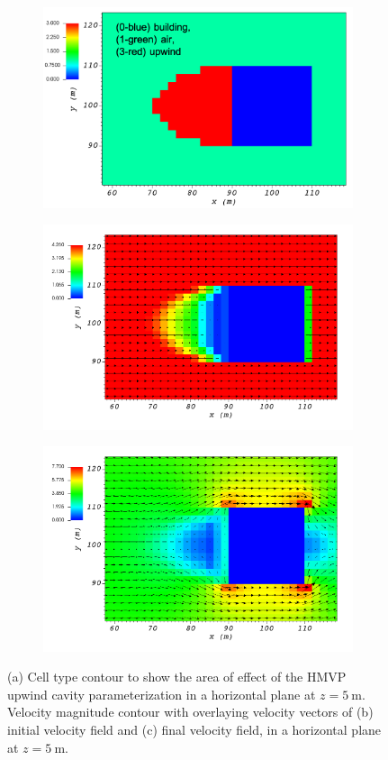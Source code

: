 \begin{figure}[H]
    \centering
    \begin{subfigure}{\textwidth}
    \centering
    \includegraphics[width=10.3cm,keepaspectratio]{Images/upwind_z_5_3_init_icell.png}
    \caption{}
    \end{subfigure}
    \begin{subfigure}{\textwidth}
    \centering
    \includegraphics[width=11.0cm,keepaspectratio]{Images/upwind_z_5_3_init_vel.png}
    \caption{}
    \end{subfigure}
    \begin{subfigure}{\textwidth}
    \centering
    \includegraphics[width=11.0cm,keepaspectratio]{Images/upwind_z_5_3_final.png}
    \caption{}
    \end{subfigure}
    \caption{(a) Cell type contour to show the area of effect of the HMVP upwind cavity parameterization in a horizontal plane at $z=5\ \si{\meter}$. Velocity magnitude contour with overlaying velocity vectors of (b) initial velocity field and (c) final velocity field, in a horizontal plane at $z=5\ \si{\meter}$.}
\end{figure}

